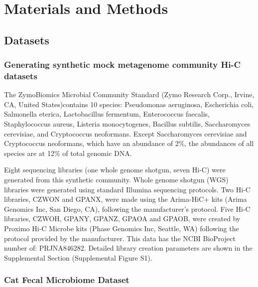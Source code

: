 \documentclass[fleqn,10pt,lineno]{wlpeerj}
\providecommand{\DIFaddtex}[1]{{\protect\color{blue}\uwave{#1}}} %
\providecommand{\DIFaddbegin}{} %
\providecommand{\DIFaddend}{} %
\providecommand{\DIFadd}[1]{\texorpdfstring{\DIFaddtex{#1}}{#1}} %
\newcommand{\DIFaddincludegraphics}[2][]{{\color{blue}\fbox{\DIFOincludegraphics[#1]{#2}}}} %
\DeclareRobustCommand{\DIFaddbegin}{\DIFOaddbegin \let\includegraphics\DIFaddincludegraphics} %
\DeclareRobustCommand{\DIFaddend}{\DIFOaddend \let\includegraphics\DIFOincludegraphics} %
\begin{document}
\section*{Materials and Methods}

\subsection*{Datasets}

\subsubsection*{Generating synthetic mock metagenome community Hi-C datasets}

The ZymoBiomics Microbial Community Standard (Zymo Research Corp., Irvine, CA, United States)\DIFaddbegin \DIFadd{, referred to as Zymo Mock dataset, }\DIFaddend contains 10 species: Pseudomonas aeruginosa, Escherichia coli, Salmonella eterica, Lactobacillus fermentum, Enterococcus faecalis, Staphylococcus aureus, Listeria monocytogenes, Bacillus subtilis, Saccharomyces cerevisiae, and Cryptococcus neoformans. Except Saccharomyces cerevisiae and Cryptococcus neoformans, which have an abundance of 2\%, the abundances of all species are at 12\% of total genomic DNA.\DIFaddbegin {}
\DIFaddend 

Eight sequencing libraries (one whole genome shotgun, seven Hi-C) were generated from this synthetic community. Whole genome shotgun  (WGS)  libraries were generated using standard Illumina sequencing protocols. Two Hi-C libraries, CZWON and GPANX, were made using the Arima-HiC+ kits (Arima Genomics Inc, San Diego, CA), following the manufacturer's protocol. Five Hi-C libraries, CZWOH, GPANY, GPANZ, GPAOA and GPAOB, were created by Proximo Hi-C Microbe kits (Phase Genomics Inc, Seattle, WA) following the protocol provided by the manufacturer. This data has the NCBI BioProject number of: PRJNA846282. Detailed library creation parameters are shown in the Supplemental Section (Supplemental Figure S1).

\subsubsection*{Cat Fecal Microbiome Dataset} 
\end{document}
